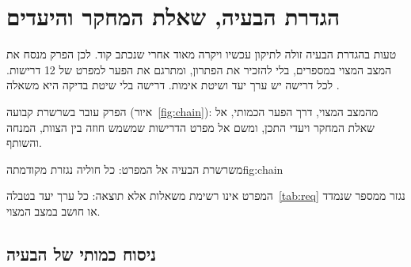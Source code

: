 \chapter{הגדרת הבעיה, שאלת המחקר והיעדים}
\label{ch:problem}

\begin{managerbox}
טעות בהגדרת הבעיה זולה לתיקון עכשיו ויקרה מאוד אחרי שנכתב קוד. לכן הפרק מנסח את המצב המצוי במספרים, בלי להזכיר את הפתרון, ומתרגם את הפער למפרט של \num{12} דרישות. לכל דרישה יש ערך יעד ושיטת אימות. דרישה בלי שיטת בדיקה היא משאלה \cite{segal2026booklet}.
\end{managerbox}

הפרק עובר בשרשרת קבועה (איור~\ref{fig:chain}): מהמצב המצוי, דרך הפער הכמותי, אל שאלת המחקר ויעדי התכן, ומשם אל מפרט הדרישות שמשמש חוזה בין הצוות, המנחה והשותף.

\begin{reportfigure}{משרשרת הבעיה אל המפרט: כל חוליה נגזרת מקודמתה}{fig:chain}
\end{reportfigure}

המפרט אינו רשימת משאלות אלא תוצאה: כל ערך יעד בטבלה~\ref{tab:req} נגזר ממספר שנמדד או חושב במצב המצוי.

\section{ניסוח כמותי של הבעיה}
\label{sec:problem-quant}

